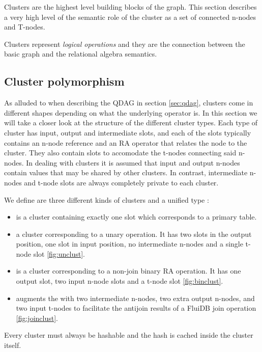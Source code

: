 Clusters are the highest level building blocks of the graph. This
section describes a very high level of the semantic role of the
cluster as a set of connected n-nodes and T-nodes.

Clusters represent \emph{logical operations} and they are the connection
between the basic graph and the relational algebra semantics.

\subsection{Cluster polymorphism}
\label{sec:cluster_polymorphism}

As alluded to when describing the QDAG in section \ref{sec:qdag},
clusters come in different shapes depending on what the underlying
operator is. In this section we will take a closer look at the
structure of the different cluster types. Each type of cluster has
input, output and intermediate slots, and each of the slots typically
contains an n-node reference and an
RA operator that relates
the node to the cluster. They also contain slots to accomodate the
t-nodes connecting said n-nodes. In dealing with clusters it is
assumed that input and output n-nodes contain values that may be shared
by other clusters. In contrast, intermediate n-nodes and t-node slots are
always completely private to each cluster.

We define are three different kinds of clusters and a unified type
:

\begin{itemize}
\item {} is a cluster containing exactly one slot which
  corresponds to a primary table.
\item {} a cluster corresponding to a unary operation. It
  has two slots in the output position, one slot in input position, no
  intermediate n-nodes and a single t-node slot \ref{fig:unclust}.
\item {} is a cluster corresponding to a non-join binary
  RA operation. It has one output slot, two input n-node slots and a t-node
  slot \ref{fig:binclust}.
\item {} augments the  with two
  intermediate n-nodes, two extra output n-nodes, and two input t-nodes to
  facilitate the antijoin results of a FluiDB join operation
  \ref{fig:joinclust}.
\end{itemize}

Every cluster must always be hashable and the hash is cached inside
the cluster itself.

